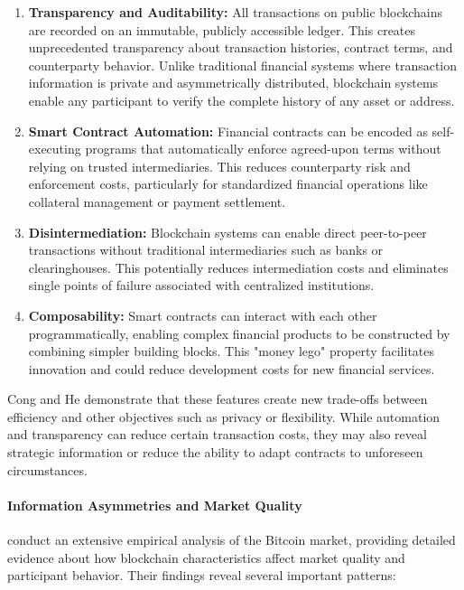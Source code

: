 \begin{enumerate}
    \item \textbf{Transparency and Auditability:} All transactions on public blockchains are recorded on an immutable, publicly accessible ledger. This creates unprecedented transparency about transaction histories, contract terms, and counterparty behavior. Unlike traditional financial systems where transaction information is private and asymmetrically distributed, blockchain systems enable any participant to verify the complete history of any asset or address.
    
    \item \textbf{Smart Contract Automation:} Financial contracts can be encoded as self-executing programs that automatically enforce agreed-upon terms without relying on trusted intermediaries. This reduces counterparty risk and enforcement costs, particularly for standardized financial operations like collateral management or payment settlement.
    
    \item \textbf{Disintermediation:} Blockchain systems can enable direct peer-to-peer transactions without traditional intermediaries such as banks or clearinghouses. This potentially reduces intermediation costs and eliminates single points of failure associated with centralized institutions.
    
    \item \textbf{Composability:} Smart contracts can interact with each other programmatically, enabling complex financial products to be constructed by combining simpler building blocks. This "money lego" property facilitates innovation and could reduce development costs for new financial services.
\end{enumerate}

Cong and He demonstrate that these features create new trade-offs between efficiency and other objectives such as privacy or flexibility. While automation and transparency can reduce certain transaction costs, they may also reveal strategic information or reduce the ability to adapt contracts to unforeseen circumstances.

\paragraph{Information Asymmetries and Market Quality}

 conduct an extensive empirical analysis of the Bitcoin market, providing detailed evidence about how blockchain characteristics affect market quality and participant behavior. Their findings reveal several important patterns:


